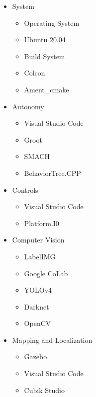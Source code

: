 \begin{itemize}
    \item System 
        \begin{itemize}
            \item Operating System 
            \item Ubuntu 20.04 
            \item Build System 
            \item Colcon 
            \item Ament\_cmake 
        \end{itemize}

    \item Autonomy 
        \begin{itemize}
            \item Visual Studio Code 
            \item Groot 
            \item SMACH 
            \item BehaviorTree.CPP 
        \end{itemize}

    \item Controls 
        \begin{itemize}
            \item Visual Studio Code 
            \item Platform.I0 
        \end{itemize}

    \item Computer Vision 
        \begin{itemize}
            \item LabelIMG 
            \item Google CoLab 
            \item YOLOv4 
            \item Darknet 
            \item OpenCV 
        \end{itemize}

    \item Mapping and Localization 
        \begin{itemize}
            \item Gazebo 
            \item Visual Studio Code 
            \item Cubik Studio
        \end{itemize}
\end{itemize}

